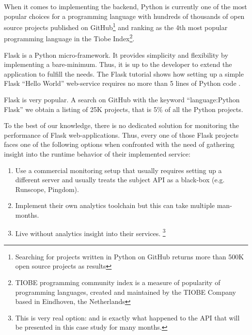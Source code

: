\documentclass[conference]{IEEEtran}
\begin{document}

When it comes to implementing the backend, Python is currently one of the most popular choices for a programming language with hundreds of thousands of open source projects published on GitHub\footnote{Searching for projects written in Python on GitHub returns more than 500K open source projects as results} and ranking as the 4th most popular programming language in the Tiobe Index\footnote{TIOBE programming community index is a measure of popularity of programming languages, created and maintained by the TIOBE Company based in Eindhoven, the Netherlands}. 


Flask is a Python micro-framework. It provides simplicity and flexibility by implementing a bare-minimum. Thus, it is up to the developer to extend the application to fulfill the needs. The Flask tutorial shows how setting up a simple Flask ``Hello World'' web-service requires no more than 5 lines of Python code \cite{ flask:tutorial}.

Flask is very popular. A search on GitHub with the keyword ``language:Python Flask'' we obtain a listing of 25K projects, that is 5\% of all the Python projects. 


To the best of our knowledge, there is no dedicated solution for monitoring the performance of Flask web-applications. Thus, every one of those Flask projects faces one of the following options when confronted with the need of gathering insight into the runtime behavior of their implemented service: 

  \begin{enumerate}

    \item Use a commercial monitoring setup that usually requires setting up a different server and usually treats the subject API as a black-box (e.g. Runscope, Pingdom). 

    \item Implement their own analytics toolchain but this can take multiple man-months. 

    \item Live without analytics insight into their services. \footnote{This is very real option: and is exactly what happened to the API that will be presented in this case study for many months. }

  \end{enumerate}
\end{document}

